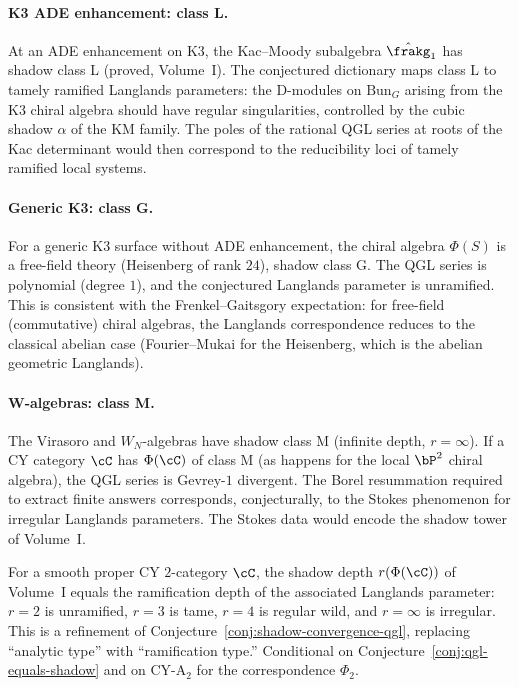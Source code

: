 \paragraph{K3 ADE enhancement: class L.}
At an ADE enhancement on K3, the Kac--Moody subalgebra $\hat{\frakg}_1$ has shadow class L (proved, Volume~I). The conjectured dictionary maps class L to tamely ramified Langlands parameters: the D-modules on $\mathrm{Bun}_G$ arising from the K3 chiral algebra should have regular singularities, controlled by the cubic shadow $\alpha$ of the KM family. The poles of the rational QGL series at roots of the Kac determinant would then correspond to the reducibility loci of tamely ramified local systems.

\paragraph{Generic K3: class G.}
For a generic K3 surface without ADE enhancement, the chiral algebra $\Phi(S)$ is a free-field theory (Heisenberg of rank $24$), shadow class G. The QGL series is polynomial (degree $1$), and the conjectured Langlands parameter is unramified. This is consistent with the Frenkel--Gaitsgory expectation: for free-field (commutative) chiral algebras, the Langlands correspondence reduces to the classical abelian case (Fourier--Mukai for the Heisenberg, which is the abelian geometric Langlands).

\paragraph{W-algebras: class M.}
The Virasoro and $W_N$-algebras have shadow class M (infinite depth, $r = \infty$). If a CY category $\cC$ has $\Phi(\cC)$ of class M (as happens for the local $\bP^2$ chiral algebra), the QGL series is Gevrey-$1$ divergent. The Borel resummation required to extract finite answers corresponds, conjecturally, to the Stokes phenomenon for irregular Langlands parameters. The Stokes data would encode the shadow tower of Volume~I.

\begin{conjecture}
\label{conj:shadow-ramification}
\ClaimStatusConjectured
For a smooth proper CY $2$-category $\cC$, the shadow depth $r(\Phi(\cC))$ of Volume~I equals the ramification depth of the associated Langlands parameter: $r = 2$ is unramified, $r = 3$ is tame, $r = 4$ is regular wild, and $r = \infty$ is irregular. This is a refinement of Conjecture~\ref{conj:shadow-convergence-qgl}, replacing ``analytic type'' with ``ramification type.'' Conditional on Conjecture~\ref{conj:qgl-equals-shadow} and on CY-A$_2$ for the correspondence $\Phi_2$.
\end{conjecture}

